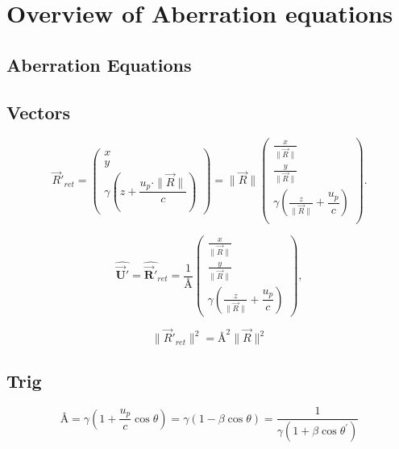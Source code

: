 \appendix
\chapter{Overview of Aberration equations}

\section{Aberration Equations}
\section{Vectors}
\begin{equation}%
\label{retarded displacement 2}
    \Vec{R}'_{ret}= \begin{pmatrix}
    x\\ y \\ \gamma \left(z + \dfrac{u_p \cdot \|\vec{R}\|}{c}\right)
    \end{pmatrix} = \|\vec{R}\|\begin{pmatrix}
    \frac{x}{\|\vec{R}\|}\\ \frac{y}{\|\vec{R}\|} \\ \gamma \left( \frac{z}{\|\vec{R}\|} + \dfrac{u_p}{c} \right)\\
    \end{pmatrix}.
\end{equation}%

\begin{equation}%
\label{eq: unit retarded velocity 2}
    \hat{\mathbf{\vec{U}'}} = \hat{\mathbf{\vec{R}'}}_{ret} = \dfrac{1}{\text{\AA}} \begin{pmatrix}
    \frac{x}{\|\vec{R}\|}\\ \frac{y}{\|\vec{R}\|} \\ \gamma \left( \frac{z}{\|\vec{R}\|} + \dfrac{u_p}{c} \right)
    \end{pmatrix},
\end{equation}%

\begin{equation}%
\label{eq: field displacement transform 2}
    \|\Vec{R}'_{ret}\|^2 = \text{\AA}^2 \|\vec{R}\|^2
\end{equation}%

\section{Trig}
\begin{equation}%
    \text{\AA} = \gamma\left(1+\dfrac{u_p}{c}\cos\theta\right) = \gamma\left(1-\beta\cos\theta\right) = \frac{1}{\gamma\left(1+\beta\cos\theta^{'}\right)}
\end{equation}%

